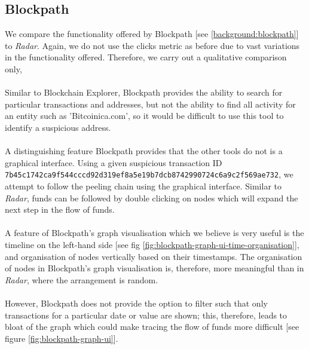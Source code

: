 \subsection{Blockpath}
We compare the functionality offered by Blockpath [see \ref{background:blockpath}] to \textit{Radar}. Again, we do not use the clicks metric as before due to vast variations in the functionality offered. Therefore, we carry out a qualitative comparison only,
\\\\
Similar to Blockchain Explorer, Blockpath provides the ability to search for particular transactions and addresses, but not the ability to find all activity for an entity such as 'Bitcoinica.com', so it would be difficult to use this tool to identify a suspicious address. 
\\\\
A distinguishing feature Blockpath provides that the other tools do not is a graphical interface. Using a given suspicious transaction ID \\\texttt{7b45c1742ca9f544cccd92d319ef8a5e19b7dcb8742990724c6a9c2f569ae732}, we attempt to follow the peeling chain using the graphical interface. Similar to \textit{Radar}, funds can be followed by double clicking on nodes which will expand the next step in the flow of funds. 
\\\\
A feature of Blockpath's graph visualisation which we believe is very useful is the timeline on the left-hand side [see fig \ref{fig:blockpath-graph-ui-time-organisation}], and organisation of nodes vertically based on their timestamps. The organisation of nodes in Blockpath's graph visualisation is, therefore, more meaningful than in \textit{Radar}, where the arrangement is random. 
\\\\
However, Blockpath does not provide the option to filter such that only transactions for a particular date or value are shown; this, therefore, leads to bloat of the graph which could make tracing the flow of funds more difficult [see figure \ref{fig:blockpath-graph-ui}]. 


